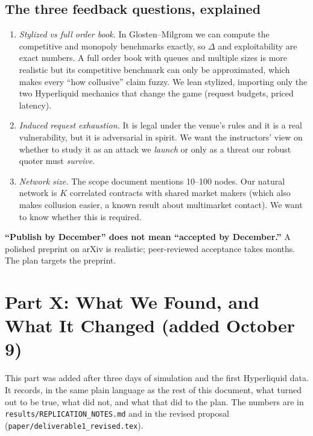 \documentclass[11pt]{article}
\begin{document}
\subsection{The three feedback questions, explained}
\begin{enumerate}
\item \emph{Stylized vs full order book.} In Glosten--Milgrom we can compute the competitive and monopoly benchmarks exactly, so $\Delta$ and exploitability are exact numbers. A full order book with queues and multiple sizes is more realistic but its competitive benchmark can only be approximated, which makes every ``how collusive'' claim fuzzy. We lean stylized, importing only the two Hyperliquid mechanics that change the game (request budgets, priced latency).
\item \emph{Induced request exhaustion.} It is legal under the venue's rules and it is a real vulnerability, but it is adversarial in spirit. We want the instructors' view on whether to study it as an attack we \emph{launch} or only as a threat our robust quoter must \emph{survive}.
\item \emph{Network size.} The scope document mentions 10--100 nodes. Our natural network is $K$ correlated contracts with shared market makers (which also makes collusion easier, a known result about multimarket contact). We want to know whether this is required.
\end{enumerate}

\begin{warning}
\textbf{``Publish by December'' does not mean ``accepted by December.''} A polished preprint on arXiv is realistic; peer-reviewed acceptance takes months. The plan targets the preprint.
\end{warning}


\section{Part X: What We Found, and What It Changed (added October 9)}
This part was added after three days of simulation and the first Hyperliquid data. It records,
in the same plain language as the rest of this document, what turned out to be true, what did not,
and what that did to the plan. The numbers are in \texttt{results/REPLICATION\_NOTES.md} and in the
revised proposal (\texttt{paper/deliverable1\_revised.tex}).
\end{document}
